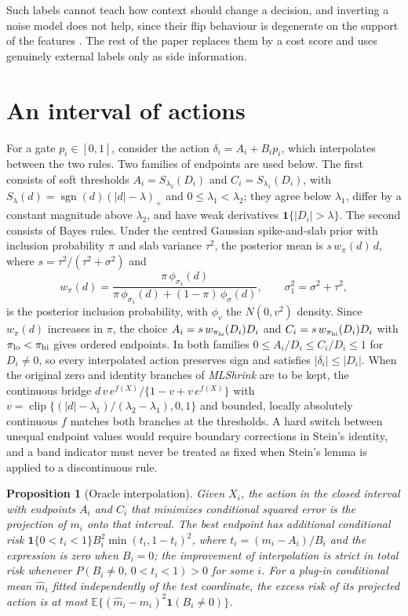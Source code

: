\documentclass[11pt]{article}
\theoremstyle{plain}
\newtheorem{proposition}{Proposition}
\theoremstyle{definition}
\theoremstyle{remark}
\newcommand{\E}{\mathbb E}
\newcommand{\ind}{\mathbf 1}
\DeclareMathOperator{\clip}{clip}
\DeclareMathOperator{\sgn}{sgn}
\begin{document}
Such labels cannot teach how context should change a decision, and inverting a noise model
does not help, since their flip behaviour is degenerate on the support of the features
\citep{natarajan2013learning,liu2023identifiability}. The rest of the paper replaces them by
a cost score and uses genuinely external labels only as side information.

\section{An interval of actions}\label{sec:interval}

For a gate $p_i\in[0,1]$, consider the action $\delta_i=A_i+B_ip_i$, which interpolates
between the two rules. Two families of endpoints are used below. The first consists of soft
thresholds $A_i=S_{\lambda_2}(D_i)$ and $C_i=S_{\lambda_1}(D_i)$, with
$S_\lambda(d)=\sgn(d)(|d|-\lambda)_+$ and $0\le\lambda_1<\lambda_2$; they agree below
$\lambda_1$, differ by a constant magnitude above $\lambda_2$, and have weak derivatives
$\ind\{|D_i|>\lambda\}$. The second consists of Bayes rules. Under the centred Gaussian
spike-and-slab prior with inclusion probability $\pi$ and slab variance $\tau^2$, the
posterior mean is $s\,w_\pi(d)\,d$, where $s=\tau^2/(\tau^2+\sigma^2)$ and
\begin{equation}\label{eq:wpi}
w_\pi(d)=\frac{\pi\,\phi_{\sigma_1}(d)}{\pi\,\phi_{\sigma_1}(d)+(1-\pi)\,\phi_\sigma(d)},
\qquad \sigma_1^2=\sigma^2+\tau^2,
\end{equation}
is the posterior inclusion probability, with $\phi_v$ the $N(0,v^2)$ density. Since
$w_\pi(d)$ increases in $\pi$, the choice $A_i=s\,w_{\pi_{\rm lo}}(D_i)D_i$ and
$C_i=s\,w_{\pi_{\rm hi}}(D_i)D_i$ with $\pi_{\rm lo}<\pi_{\rm hi}$ gives ordered endpoints. In
both families $0\le A_i/D_i\le C_i/D_i\le1$ for $D_i\ne0$, so every interpolated action
preserves sign and satisfies $|\delta_i|\le|D_i|$. When the original zero and identity
branches of \emph{MLShrink} are to be kept, the continuous bridge
$d\,v\,e^{f(X)}/\{1-v+v\,e^{f(X)}\}$ with
$v=\clip\{(|d|-\lambda_1)/(\lambda_2-\lambda_1),0,1\}$ and bounded, locally absolutely
continuous $f$ matches both branches at the thresholds. A hard switch between unequal
endpoint values would require boundary corrections in Stein's identity, and a band
indicator must never be treated as fixed when Stein's lemma is applied to a discontinuous
rule.

\begin{proposition}[Oracle interpolation]\label{prop:oracle}
Given $X_i$, the action in the closed interval with endpoints $A_i$ and $C_i$ that
minimizes conditional squared error is the projection of $m_i$ onto that interval. The best
endpoint has additional conditional risk $\ind\{0<t_i<1\}B_i^2\min(t_i,1-t_i)^2$, where
$t_i=(m_i-A_i)/B_i$ and the expression is zero when $B_i=0$; the improvement of
interpolation is strict in total risk whenever $P(B_i\ne0,\,0<t_i<1)>0$ for some $i$. For a
plug-in conditional mean $\widehat m_i$ fitted independently of the test coordinate, the
excess risk of its projected action is at most
$\E\{(\widehat m_i-m_i)^2\ind(B_i\ne0)\}$.
\end{proposition}
\end{document}
